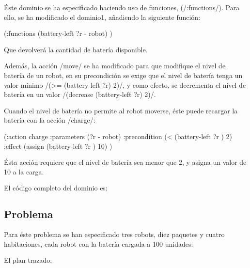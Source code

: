\documentclass[	DIV=calc,%
							paper=a4,%
							fontsize=11pt]{scrartcl}	 					%
\newcommand{\lispscript}[2]{
    \myLisp[label=#2]{#1}
}
\begin{document}
Éste dominio se ha especificado haciendo uso de funciones, (\newlispinline/:functions/). Para ello, se ha modificado el dominio1, añadiendo la siguiente función:

\begin{newlispcode}
	(:functions
		(battery-left ?r - robot)
	)
\end{newlispcode}

Que devolverá la cantidad de batería disponible.

Además, la acción \newlispinline/move/ se ha modificado para que modifique el nivel de batería de un robot, en su precondición se exige que el nivel de batería tenga un valor mínimo \newlispinline/(>= (battery-left ?r) 2)/, y como efecto, se decrementa el nivel de batería en un valor \newlispinline/(decrease (battery-left ?r) 2)/.

Cuando el nivel de batería no permite al robot moverse, éste puede recargar la batería con la acción \newlispinline/charge/:

\begin{newlispcode}
  (:action charge
    :parameters (?r - robot)
    :precondition (< (battery-left ?r ) 2)
    :effect (assign (battery-left ?r ) 10)
  )
\end{newlispcode}

Ésta acción requiere que el nivel de batería sea menor que 2, y asigna un valor de 10 a la carga.

El código completo del dominio es:

\lispscript{../d4.pddl}{d4.pddl}

\subsection{Problema}
\label{sub:Problema}

Para éste problema se han especificado tres robots, diez paquetes y cuatro habitaciones, cada robot con la batería cargada a 100 unidades:

\lispscript{../p0e4.pddl}{p0e4.pddl}

El plan trazado:
\end{document}
